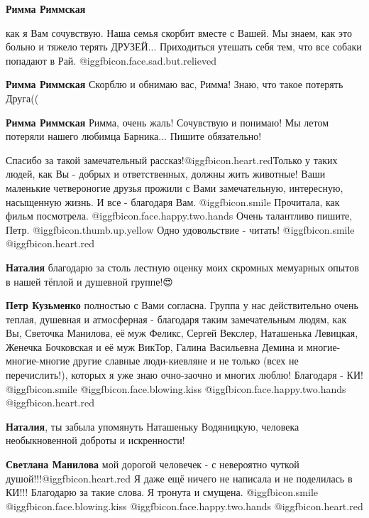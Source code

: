 \begin{itemize}
\begin{itemize}
\textbf{Римма Риммская} 

как я Вам сочувствую. Наша семья скорбит вместе с Вашей. Мы знаем, как это
больно и тяжело терять ДРУЗЕЙ... Приходиться утешать себя тем, что все собаки
попадают в Рай. @igg{fbicon.face.sad.but.relieved} 

\textbf{Римма Риммская} Скорблю и обнимаю вас, Римма! Знаю, что такое потерять Друга((

\textbf{Римма Риммская}
Римма, очень жаль! Сочувствую и понимаю! Мы летом потеряли нашего любимца Барника...
Пишите обязательно!
\end{itemize} %


Спасибо за такой замечательный рассказ!@igg{fbicon.heart.red}Только у таких
людей, как Вы - добрых и ответственных, должны жить животные! Ваши маленькие
четвероногие друзья прожили с Вами замечательную, интересную, насыщенную жизнь.
И все - благодаря Вам. @igg{fbicon.smile}  Прочитала, как фильм посмотрела.
@igg{fbicon.face.happy.two.hands}  Очень талантливо пишите, Петр.
@igg{fbicon.thumb.up.yellow}  Одно удовольствие - читать!  @igg{fbicon.smile}
@igg{fbicon.heart.red}

\begin{itemize} %
\textbf{Наталия} благодарю за столь лестную оценку моих скромных мемуарных опытов в нашей тёплой и душевной группе!😍

\begin{itemize} %
\textbf{Петр Кузьменко} полностью с Вами согласна. Группа у нас действительно очень теплая, душевная и атмосферная - благодаря таким замечательным людям, как Вы, Светочка Манилова, её муж Феликс, Сергей Векслер, Наташенька Левицкая, Женечка Бочковская и её муж ВикТор, Галина Васильевна Демина и многие-многие-многие другие славные люди-киевляне и не только (всех не перечислить!), которых я уже знаю очно-заочно и многих люблю! Благодаря - КИ!  @igg{fbicon.smile}  @igg{fbicon.face.blowing.kiss}  @igg{fbicon.face.happy.two.hands}  @igg{fbicon.heart.red}

\textbf{Наталия}, ты забыла упомянуть Наташеньку Водяницкую, человека необыкновенной доброты и искренности!

\textbf{Светлана Манилова} мой дорогой человечек - с невероятно чуткой душой!!!@igg{fbicon.heart.red} Я даже ещё ничего не написала и не поделилась в КИ!!! Благодарю за такие слова. Я тронута и смущена. @igg{fbicon.smile}  @igg{fbicon.face.blowing.kiss}  @igg{fbicon.face.happy.two.hands} @igg{fbicon.heart.red}


\end{itemize}
\end{itemize}
\end{itemize}
